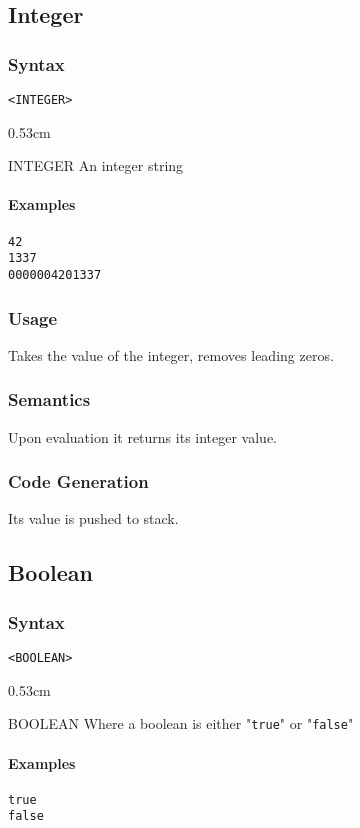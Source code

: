 \documentclass[twoside]{report}
\newenvironment{mycompactdesc}{\begin{adjustwidth}{0.53cm}{}\begin{compactdesc}}{\end{compactdesc}\end{adjustwidth}}
\begin{document}
\subsection{Integer}
\label{def:integer}
\subsubsection*{Syntax}
\texttt{<INTEGER>}
\begin{mycompactdesc}
	\item[INTEGER] An integer string
\end{mycompactdesc}
\paragraph{Examples}
\begin{verbatim}
42
1337
0000004201337
\end{verbatim}
\subsubsection*{Usage}
Takes the value of the integer, removes leading zeros.
\subsubsection*{Semantics}
Upon evaluation it returns its integer value.
\subsubsection*{Code Generation}
Its value is pushed to stack.


\subsection{Boolean}
\label{def:boolean}
\subsubsection*{Syntax}
\texttt{<BOOLEAN>}
\begin{mycompactdesc}
	\item[BOOLEAN] Where a boolean is either "\texttt{true}" or "\texttt{false}"
\end{mycompactdesc}
\paragraph{Examples}
\begin{verbatim}
true
false
\end{verbatim}
\end{document}
